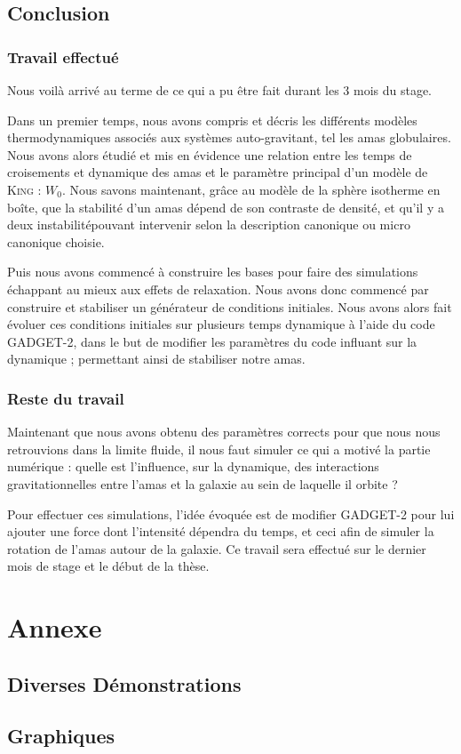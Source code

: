 \documentclass[a4paper,11pt,twoside,openright]{report}
\renewcommand{\(}{\ensuremath{\left(}}
\renewcommand{\)}{\ensuremath{\right)}}
\begin{document}
		\chapter*{Conclusion}
			\section*{Travail effectué}
				Nous voilà arrivé au terme de ce qui a pu être fait durant les 3 mois du stage.

				Dans un premier temps, nous avons compris et décris les différents modèles thermodynamiques associés aux systèmes auto-gravitant, tel les amas globulaires.
				Nous avons alors étudié et mis en évidence une relation entre les temps de croisements et dynamique des amas et le paramètre principal d'un modèle de \textsc{King} : $W_0$. Nous savons maintenant,
				grâce au modèle de la sphère isotherme en boîte, que la stabilité d'un amas dépend de son contraste de densité, et qu'il y a deux instabilitépouvant intervenir selon la description canonique ou
				micro canonique choisie.

				Puis nous avons commencé à construire les bases pour faire des simulations échappant au mieux aux effets de relaxation. Nous avons donc commencé par construire et stabiliser un générateur de
				conditions initiales.
				Nous avons alors fait évoluer ces conditions initiales sur plusieurs temps dynamique à l'aide du code \textsc{GADGET-2}, dans le but de modifier les paramètres du code influant sur la dynamique ; permettant ainsi de stabiliser notre amas.

			\section*{Reste du travail}
				Maintenant que nous avons obtenu des paramètres corrects pour que nous nous retrouvions dans la limite fluide, il nous faut simuler ce qui a motivé la partie numérique : quelle est l'influence, sur la
				dynamique, des interactions gravitationnelles entre l'amas et la galaxie au sein de laquelle il orbite ?

				Pour effectuer ces simulations, l'idée évoquée est de modifier \textsc{GADGET-2} pour lui ajouter une force dont l'intensité dépendra du temps, et ceci afin de simuler la rotation de l'amas autour de la galaxie.
				Ce travail sera effectué sur le dernier mois de stage et le début de la thèse.

	
	

	\appendix
	\part{Annexe}
		\chapter{Diverses Démonstrations}
			\minitoc
			

		\chapter{Graphiques}
			\minitoc
			
\end{document}

